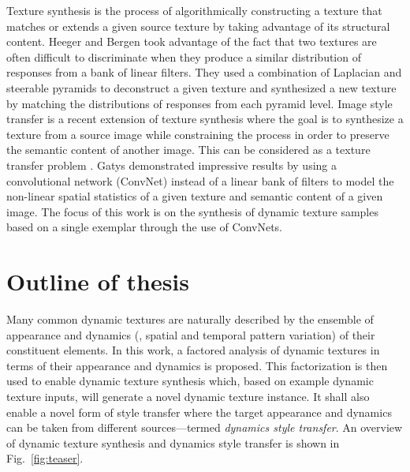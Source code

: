 Texture synthesis  is the process of algorithmically constructing a texture that
matches or extends a given source texture by taking advantage of its structural 
content. Heeger and Bergen \cite{heeger1995pyramid} took advantage of the fact 
that two textures are often difficult to discriminate when they produce a similar 
distribution of responses from a bank of linear filters. They used a combination 
of Laplacian and steerable pyramids to deconstruct a given texture and 
synthesized a new texture by matching the distributions of responses from each
pyramid level. Image style transfer  is a recent extension of texture synthesis where the goal is to 
synthesize a texture from a source image while constraining the process in order 
to preserve the semantic content of another image. This can be considered as a 
texture transfer problem . Gatys \etal \cite{gatys2016image} demonstrated 
impressive results by using a convolutional network (ConvNet) instead of a linear 
bank of filters to model the non-linear spatial statistics of a given texture and semantic content of a given image. The focus of this work is on the synthesis of dynamic texture 
samples based on a single exemplar through the use of ConvNets. 

\section{Outline of thesis}

Many common dynamic textures are naturally described by the ensemble of 
appearance and dynamics (\ie, spatial and temporal pattern variation) of their 
constituent elements. In this work, a factored analysis of dynamic 
textures in terms of their appearance and dynamics is proposed.
This factorization is then used to enable dynamic texture synthesis
which, based on example dynamic texture inputs, will generate a novel dynamic
texture instance.
It shall also enable a novel form of style transfer where the 
target appearance and dynamics can be taken from different sources---termed \emph{dynamics style transfer}.
An overview of dynamic texture synthesis and dynamics style transfer
is shown in Fig.\ \ref{fig:teaser}.



